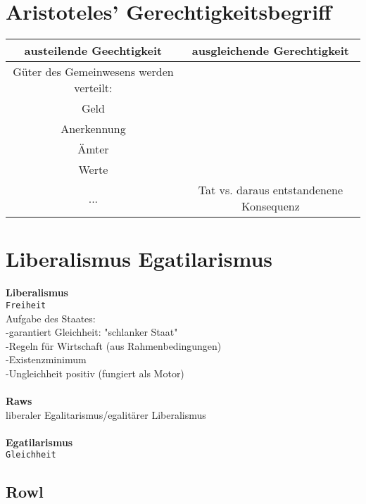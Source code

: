 \documentclass[12pt, letterpaper]{article}
\begin{document}
\section{Aristoteles' Gerechtigkeitsbegriff}
\label{sec:Aristoteles' Gerechtigkeitsbegriff}
\begin{tabular}{cc}
	austeilende Geechtigkeit&ausgleichende Gerechtigkeit\\
	\hline
	Güter des Gemeinwesens werden verteilt:\\
		Geld\\
		Anerkennung\\
		Ämter\\
		Werte\\
		...
		
	&Tat vs. daraus entstandenene Konsequenz	
\end{tabular}
\newpage
\section{Liberalismus Egatilarismus}
\label{sec:Liberalismus Egatilarismus}
\textbf{Liberalismus}\\
\texttt{Freiheit}	
\\Aufgabe des Staates:
\\-garantiert Gleichheit: "schlanker Staat"
\\-Regeln für Wirtschaft (aus Rahmenbedingungen)
\\-Existenzminimum
\\-Ungleichheit positiv (fungiert als Motor)
\\\\\textbf{Raws}	\\
liberaler Egalitarismus/egalitärer Liberalismus
\\\\\textbf{Egatilarismus}	
\\\texttt{Gleichheit}	
\subsection{Rowl}
\label{sec:Rowl}
\end{document}
